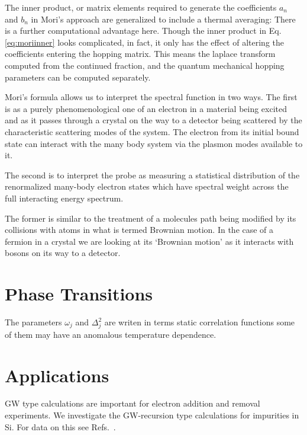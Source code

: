 The inner product, or matrix elements required to generate the coefficients 
$a_{n}$ and $b_{n}$ in Mori's approach are generalized to include a thermal averaging:
There is a further computational advantage here. Though the inner product in Eq.\ref{eq:moriinner}
looks complicated, in fact, it only has the effect of altering the coefficients entering
the hopping matrix. This means the laplace transform computed from the continued fraction,
and the quantum mechanical hopping parameters can be computed separately.

Mori's formula allows us to interpret the spectral function in two ways. The first is as
a purely phenomenological one of an electron in a material being excited and as it passes through
a crystal on the way to a detector being scattered by the characteristic scattering modes of the
system. The electron from its initial bound state can interact with the many body system via
the plasmon modes available to it.

The second is to interpret the probe as measuring a statistical distribution of the 
renormalized many-body electron states which have spectral weight across the full
interacting energy spectrum. 

The former is similar to the treatment of a molecules path
being modified by its collisions with atoms in what is termed Brownian motion. In the
case of a fermion in a crystal we are looking at its `Brownian motion' as it interacts
with bosons on its way to a detector. 

\section{Phase Transitions}
The parameters $\omega_{j}$ and $\Delta^{2}_{j}$ are writen in terms static
correlation functions some of them may have an anomalous temperature dependence.

\section{Applications }
GW type calculations are important for electron addition and removal 
experiments. We investigate the GW-recursion type calculations for 
impurities in Si. For data on this see Refs.~\cite{lehto78}.

